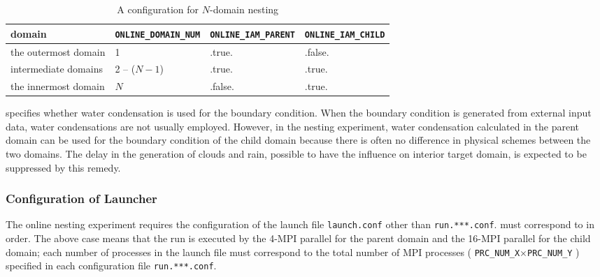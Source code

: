 \begin{table}[htb]
\begin{center}
\caption{A configuration for $N$-domain nesting}
\begin{tabularx}{150mm}{|l|l|l|X|} \hline
 \rowcolor[gray]{0.9} domain & \verb|ONLINE_DOMAIN_NUM| & \verb|ONLINE_IAM_PARENT| & \verb|ONLINE_IAM_CHILD|\\ \hline
 the outermost domain & 1            & .true.  & .false. \\ \hline
 intermediate domains & 2 -- ($N-1$) & .true.  & .true. \\ \hline
 the innermost domain & $N$          & .false. & .true. \\ \hline
\end{tabularx}
\label{tab:triple_nested}
\end{center}
\end{table}


 specifies whether water condensation is used for the boundary condition. When the boundary condition is generated from external input data, water condensations are not usually employed. However, in the nesting experiment, water condensation calculated in the parent domain can be used for the boundary condition of the child domain because there is often no difference in physical schemes between the two domains.
The delay in the generation of clouds and rain, possible to have the influence on interior target domain, is expected to be suppressed by this remedy.

\subsubsection{Configuration of Launcher}
\label{subsubsec:launch}
The online nesting experiment requires the configuration of the launch file \verb|launch.conf|
other than \verb|run.***.conf|.
 must correspond to  in order.
The above case means that
the run is executed by
the 4-MPI parallel for the parent domain 
and the 16-MPI parallel for the child domain;
each number of processes in the launch file 
must correspond to the total number of MPI processes ( \verb|PRC_NUM_X|$\times$\verb|PRC_NUM_Y| )
specified in each configuration file \verb|run.***.conf|.

